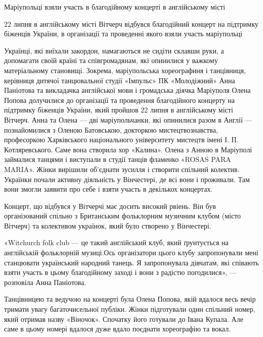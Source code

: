  
 
 
 
 

Маріупольці взяли участь в благодійному концерті в англійському місті

22 липня в англійському місті Вітчерч відбувся благодійний концерт на підтримку
біженців України, в організації та проведенні якого взяли участь маріупольці

Українці, які виїхали закордон, намагаються не сидіти склавши руки, а
допомагати своїй країні та співгромадянам, які опинилися у важкому
матеріальному становищі. Зокрема, маріупольська хореографиня і танцівниця,
керівниця дитячої танцювальної студії «Імпульс» ПК «Молодіжний» Анна Паніотова
та викладачка англійської мови і громадська діячка Маріуполя Олена Попова
долучилися до організації та проведення благодійного концерту на підтримку
біженців України, який пройшов 22 липня в англійському місті Вітчерч. Анна та
Олена — дві маріупольчанки, які опинилися разом в Англії — познайомилися з
Оленою Батовською, докторкою мистецтвознавства, професоркою Харківського
національного університету мистецтв імені І. П. Котляревського. Саме вона
створила хор «Калина». Олена з Анною в Маріуполі займалися танцями і виступали
в студії танців фламенко «ROSAS PARA MARIA». Жінки вирішили об'єднати зусилля і
створити спільний колектив. Українки почали активну діяльність у Вінчестері, де
всі вони і проживали. Там вони змогли заявити про себе і взяти участь в
декількох концертах.

Концерт, що відбувся у Вітчерчі має досить високий рвіень. Він був
організований спільно з Британським фольклорним музичним клубом (місто Вітчерч)
та колективом українок, який було створено у Вінчестері.

«Witchurch folk club — це такий англійський клуб, який ґрунтується на
англійській фольклорній музиці.Ось організатори цього клубу запропонували мені
станцювати український народний танець. Я запропонувала дівчатам, які співають
взяти участь в цьому благодійному заході і вони з радістю погодилися», —
розповіла Анна Паніотова.

Танцівницею та ведучою на концерті була Олена Попова, якій вдалося весь вечір
тримати увагу багаточисельної публіки. Жінки підготували один спільний номер,
який отримав назву «Віночок». Спочатку його готували до Івана Купала. Але саме
в цьому номері вдалося дуже вдало поєднати хореографію та вокал.

